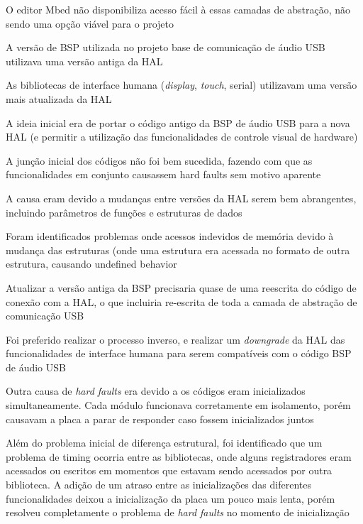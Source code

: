 O editor Mbed não disponibiliza acesso fácil à essas camadas de abstração, não sendo uma opção viável para o projeto

A versão de BSP utilizada no projeto base de comunicação de áudio USB utilizava uma versão antiga da HAL

As bibliotecas de interface humana (\textit{display}, \textit{touch}, serial) utilizavam uma versão mais atualizada da HAL

A ideia inicial era de portar o código antigo da BSP de áudio USB para a nova HAL (e permitir a utilização das funcionalidades de controle visual de hardware)

A junção inicial dos códigos não foi bem sucedida, fazendo com que as funcionalidades em conjunto causassem hard faults sem motivo aparente

A causa eram devido a mudanças entre versões da HAL serem bem abrangentes, incluindo parâmetros de funções e estruturas de dados

Foram identificados problemas onde acessos indevidos de memória devido à mudança das estruturas (onde uma estrutura era acessada no formato de outra estrutura, causando undefined behavior

Atualizar a versão antiga da BSP precisaria quase de uma reescrita do código de conexão com a HAL, o que incluiria re-escrita de toda a camada de abstração de comunicação USB

Foi preferido realizar o processo inverso, e realizar um \textit{downgrade} da HAL das funcionalidades de interface humana para serem compatíveis com o código BSP de áudio USB

Outra causa de \textit{hard faults} era devido a os códigos eram inicializados simultaneamente. Cada módulo funcionava corretamente em isolamento, porém causavam a placa a parar de responder caso fossem inicializados juntos

Além do problema inicial de diferença estrutural, foi identificado que um problema de timing ocorria entre as bibliotecas, onde alguns registradores eram acessados ou escritos em momentos que estavam sendo acessados por outra biblioteca. A adição de um atraso entre as inicializações das diferentes funcionalidades deixou a inicialização da placa um pouco mais lenta, porém resolveu completamente o problema de \textit{hard faults} no momento de inicialização
\color{black}


